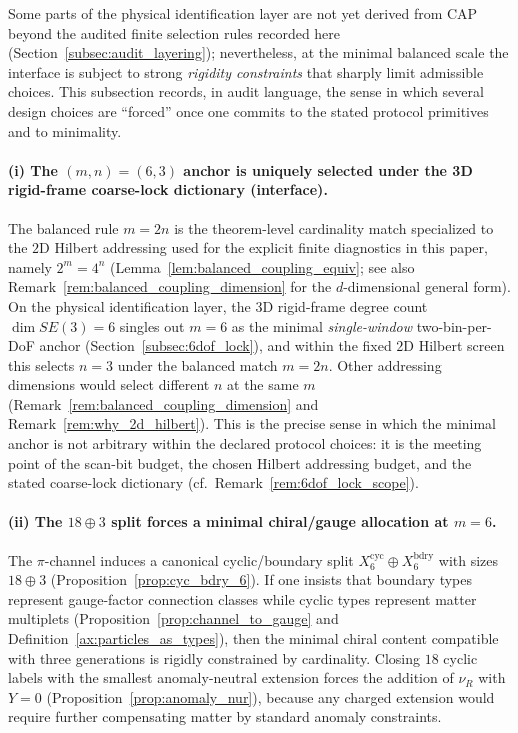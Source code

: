 Some parts of the physical identification layer are not yet derived from CAP beyond the audited finite selection rules recorded here (Section~\ref{subsec:audit_layering}); nevertheless, at the minimal balanced scale the interface is subject to strong \emph{rigidity constraints} that sharply limit admissible choices.
This subsection records, in audit language, the sense in which several design choices are ``forced'' once one commits to the stated protocol primitives and to minimality.

\paragraph{(i) The $(m,n)=(6,3)$ anchor is uniquely selected under the 3D rigid-frame coarse-lock dictionary (interface).}
The balanced rule $m=2n$ is the theorem-level cardinality match specialized to the $2$D Hilbert addressing used for the explicit finite diagnostics in this paper, namely $2^m=4^n$ (Lemma~\ref{lem:balanced_coupling_equiv}; see also Remark~\ref{rem:balanced_coupling_dimension} for the $d$-dimensional general form).
On the physical identification layer, the 3D rigid-frame degree count $\dim SE(3)=6$ singles out $m=6$ as the minimal \emph{single-window} two-bin-per-DoF anchor (Section~\ref{subsec:6dof_lock}), and within the fixed $2$D Hilbert screen this selects $n=3$ under the balanced match $m=2n$.
Other addressing dimensions would select different $n$ at the same $m$ (Remark~\ref{rem:balanced_coupling_dimension} and Remark~\ref{rem:why_2d_hilbert}).
This is the precise sense in which the minimal anchor is not arbitrary within the declared protocol choices: it is the meeting point of the scan-bit budget, the chosen Hilbert addressing budget, and the stated coarse-lock dictionary (cf.\ Remark~\ref{rem:6dof_lock_scope}).

\paragraph{(ii) The $18\oplus 3$ split forces a minimal chiral/gauge allocation at $m=6$.}
The $\pi$-channel induces a canonical cyclic/boundary split $X_6^{\mathrm{cyc}}\oplus X_6^{\mathrm{bdry}}$ with sizes $18\oplus 3$ (Proposition~\ref{prop:cyc_bdry_6}).
If one insists that boundary types represent gauge-factor connection classes while cyclic types represent matter multiplets (Proposition~\ref{prop:channel_to_gauge} and Definition~\ref{ax:particles_as_types}), then the minimal chiral content compatible with three generations is rigidly constrained by cardinality.
Closing $18$ cyclic labels with the smallest anomaly-neutral extension forces the addition of $\nu_R$ with $Y=0$ (Proposition~\ref{prop:anomaly_nur}), because any charged extension would require further compensating matter by standard anomaly constraints.

